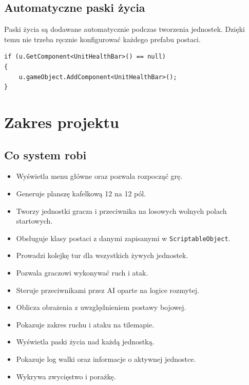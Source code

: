 \documentclass[12pt,a4paper]{article}
\begin{document}
\subsection{Automatyczne paski życia}

Paski życia są dodawane automatycznie podczas tworzenia jednostek. Dzięki temu nie trzeba ręcznie konfigurować każdego prefabu postaci.

\begin{lstlisting}[language={[Sharp]C}, caption={Dodawanie paska życia do jednostki}]
if (u.GetComponent<UnitHealthBar>() == null)
{
    u.gameObject.AddComponent<UnitHealthBar>();
}
\end{lstlisting}

\newpage

\section{Zakres projektu}

\subsection{Co system robi}

\begin{itemize}
    \item Wyświetla menu główne oraz pozwala rozpocząć grę.
    \item Generuje planszę kafelkową 12 na 12 pól.
    \item Tworzy jednostki gracza i przeciwnika na losowych wolnych polach startowych.
    \item Obsługuje klasy postaci z danymi zapisanymi w \texttt{ScriptableObject}.
    \item Prowadzi kolejkę tur dla wszystkich żywych jednostek.
    \item Pozwala graczowi wykonywać ruch i atak.
    \item Steruje przeciwnikami przez AI oparte na logice rozmytej.
    \item Oblicza obrażenia z uwzględnieniem postawy bojowej.
    \item Pokazuje zakres ruchu i ataku na tilemapie.
    \item Wyświetla paski życia nad każdą jednostką.
    \item Pokazuje log walki oraz informacje o aktywnej jednostce.
    \item Wykrywa zwycięstwo i porażkę.
\end{itemize}
\end{document}
